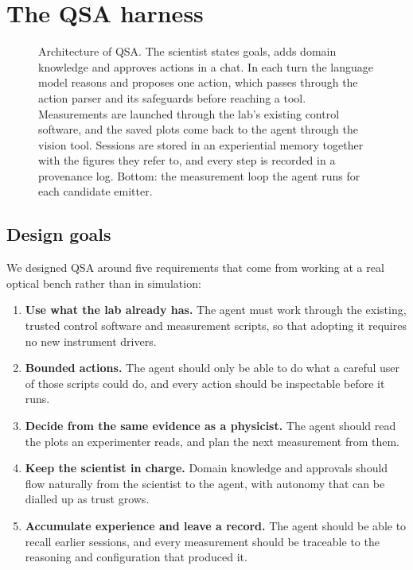 \documentclass[10pt]{article}
\newcommand{\qsa}{QSA}
\begin{document}
\section{The \qsa{} harness}
\label{sec:system}

\begin{figure}[t]
  \centering
  \resizebox{\linewidth}{!}{}
  \caption{Architecture of \qsa{}. The scientist states goals, adds domain knowledge and approves actions in a chat. In each turn the language model reasons and proposes one action, which passes through the action parser and its safeguards before reaching a tool. Measurements are launched through the lab's existing control software, and the saved plots come back to the agent through the vision tool. Sessions are stored in an experiential memory together with the figures they refer to, and every step is recorded in a provenance log. Bottom: the measurement loop the agent runs for each candidate emitter.}
  \label{fig:arch}
\end{figure}

\subsection{Design goals}
We designed \qsa{} around five requirements that come from working at a real optical bench rather than in simulation:
\begin{enumerate}[leftmargin=*]
  \item \textbf{Use what the lab already has.} The agent must work through the existing, trusted control software and measurement scripts, so that adopting it requires no new instrument drivers.
  \item \textbf{Bounded actions.} The agent should only be able to do what a careful user of those scripts could do, and every action should be inspectable before it runs.
  \item \textbf{Decide from the same evidence as a physicist.} The agent should read the plots an experimenter reads, and plan the next measurement from them.
  \item \textbf{Keep the scientist in charge.} Domain knowledge and approvals should flow naturally from the scientist to the agent, with autonomy that can be dialled up as trust grows.
  \item \textbf{Accumulate experience and leave a record.} The agent should be able to recall earlier sessions, and every measurement should be traceable to the reasoning and configuration that produced it.
\end{enumerate}
\end{document}
